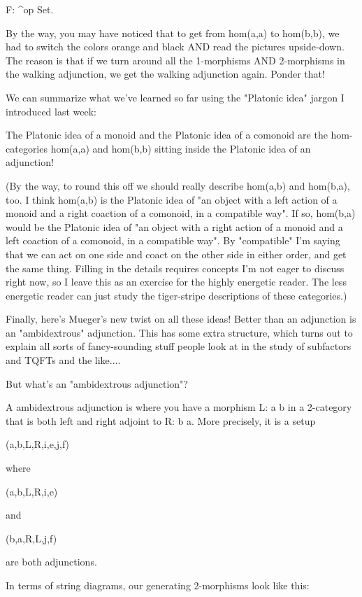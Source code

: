F: \Delta ^{op} \to  Set.

By the way, you may have noticed that to get from hom(a,a) to hom(b,b),
we had to switch the colors orange and black AND read the pictures
upside-down.  The reason is that if we turn around all the 1-morphisms
AND 2-morphisms in the walking adjunction, we get the walking adjunction
again.  Ponder that!  


We can summarize what we've learned so far using the "Platonic
idea" jargon I introduced last week:

The Platonic idea of a monoid and the Platonic idea of a comonoid are
the hom-categories hom(a,a) and hom(b,b) sitting inside the Platonic
idea of an adjunction!


 (By the way, to round this off we should really describe hom(a,b)
and hom(b,a), too.  I think hom(a,b) is the Platonic idea of "an
object with a left action of a monoid and a right coaction of a
comonoid, in a compatible way".  If so, hom(b,a) would be the
Platonic idea of "an object with a right action of a monoid and a
left coaction of a comonoid, in a compatible way".  By
"compatible" I'm saying that we can act on one side and coact
on the other side in either order, and get the same thing.  Filling in
the details requires concepts I'm not eager to discuss right now, so I
leave this as an exercise for the highly energetic reader.  The less
energetic reader can just study the tiger-stripe descriptions of these
categories.)

Finally, here's Mueger's new twist on all these ideas!  Better than
an adjunction is an "ambidextrous" adjunction.  This has some
extra structure, which turns out to explain all sorts of fancy-sounding
stuff people look at in the study of subfactors and TQFTs and the
like....

But what's an "ambidextrous adjunction"?


 A ambidextrous adjunction is where you have a morphism
L: a \to  b
in a 2-category that is both left and right adjoint to 
R: b \to  a.
More precisely, it is a setup

(a,b,L,R,i,e,j,f) 

where 

(a,b,L,R,i,e) 

and

(b,a,R,L,j,f) 

are both adjunctions.  

In terms of string diagrams, our generating 2-morphisms look like this:




